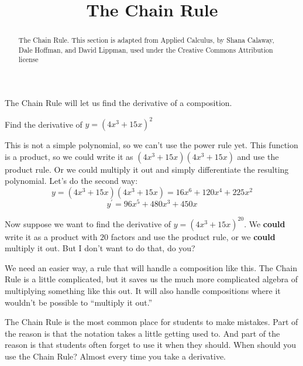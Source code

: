 \documentclass{ximera}
\title[Dig-In:]{The Chain Rule}
\begin{document}
\begin{abstract}
The Chain Rule.  This section is adapted from Applied Calculus, by Shana Calaway, Dale Hoffman, and David Lippman, used under the Creative Commons Attribution license
\end{abstract}
\maketitle

The  Chain  Rule  will  let  us  find  the  derivative  of  a  composition.  
\begin{example}
Find the derivative of $y=(4x^3+15x)^2$

This is not a simple polynomial, so we can’t use the power rule yet.  This function is a product, so we could write it as $(4x^3+15x)(4x^3+15x)$ and use the product rule.  Or we could multiply it out and simply differentiate the resulting polynomial.  Let's do the second way:
 \[ 
y=(4x^3+15x)(4x^3+15x) =16x^6+120x^4+225x^2 
\]
\[
y^{\prime}=96x^5+480x^3+450x
\]
\end{example}
Now suppose we want to find the derivative of $y=(4x^3+15x)^{20}$.  We \textbf{could} write it as a product with $20$ factors and use the product rule, or we \textbf{could} multiply it out.  But I don't want to do that, do you?

We need an easier way, a rule that will handle a composition like this.  The Chain Rule is a little complicated, but it saves us the much more complicated algebra of multiplying something like this out.  It will also handle compositions where it wouldn't be possible to ``multiply it out.''

The Chain Rule is the most common place for students to make mistakes.  Part of the reason is that the notation takes a little getting used to.  And part of the reason is that students often forget to use it when they should.  When should you use the Chain Rule?  Almost every time you take a derivative.
\end{document}
